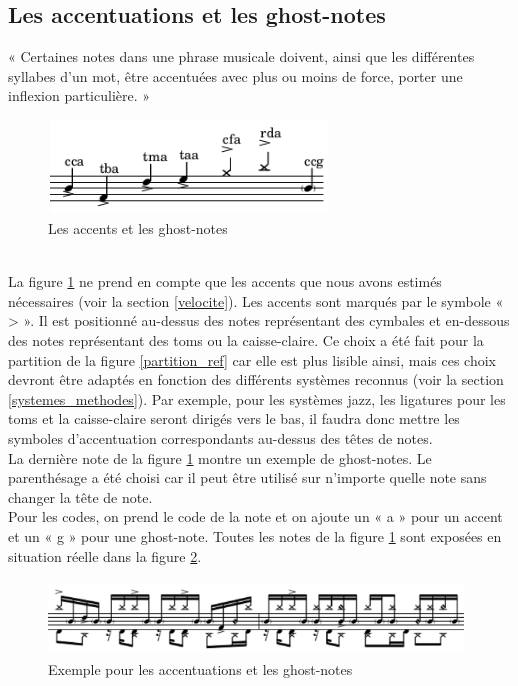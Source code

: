 \subsection*{Les accentuations et les ghost-notes}
« Certaines notes dans une phrase musicale doivent, ainsi que les différentes syllabes d’un mot, être accentuées avec plus ou moins de force, porter une inflexion particulière. » \cite{danhauser}
\begin{figure}[h]
	\centering
	\includegraphics[height=25mm, width=75mm]{z_images/3_methodes/0_notation_de_la_batterie/8_accents_et_ghost-notes_0.png}
	\caption{Les accents et les ghost-notes}
	\label{accents_et_gn}
\end{figure}\\
La figure \ref{accents_et_gn} ne prend en compte que les accents que nous avons estimés nécessaires (voir la section \ref{velocite}). Les accents sont marqués par le symbole « > ». Il est positionné au-dessus des notes représentant des cymbales et en-dessous des notes représentant des toms ou la caisse-claire. Ce choix a été fait pour la partition de la figure \ref{partition_ref} car elle est plus lisible ainsi, mais ces choix devront être adaptés en fonction des différents systèmes reconnus (voir la section \ref{systemes_methodes}). Par exemple, pour les systèmes jazz, les ligatures pour les toms et la caisse-claire seront dirigés vers le bas, il faudra donc mettre les symboles d’accentuation correspondants au-dessus des têtes de notes.\\
La dernière note de la figure \ref{accents_et_gn} montre un exemple de ghost-notes. Le parenthésage a été choisi car il peut être utilisé sur n’importe quelle note sans changer la tête de note.\\
Pour les codes, on prend le code de la note et on ajoute un « a » pour un accent et un « g » pour une ghost-note. Toutes les notes de la figure \ref{accents_et_gn} sont exposées en situation réelle dans la figure \ref{exemple_acc_et_gn}. 
\begin{figure}[h]
	\centering
	\includegraphics[height=20mm, width=110mm]{z_images/3_methodes/0_notation_de_la_batterie/8_accents_et_ghost-notes_1.png}
	\caption{Exemple pour les accentuations et les ghost-notes}
	\label{exemple_acc_et_gn}
\end{figure}\newpage
